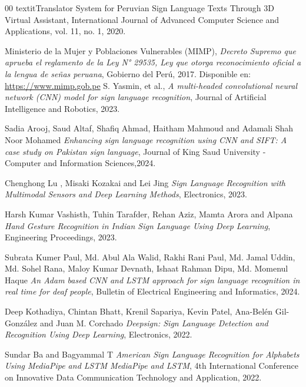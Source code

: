 \documentclass[preprint,12pt,authoryear]{elsarticle}
\begin{document}
\begin{thebibliography}{00}
 textit{Translator System for Peruvian Sign Language Texts Through 3D Virtual Assistant}, 
International Journal of Advanced Computer Science and Applications, vol. 11, no. 1, 2020.


   Ministerio de la Mujer y Poblaciones Vulnerables (MIMP),
   \textit{Decreto Supremo que aprueba el reglamento de la Ley N° 29535, Ley que otorga reconocimiento oficial a la lengua de señas peruana},
   Gobierno del Perú, 2017. Disponible en: \url{https://www.mimp.gob.pe} 
  S. Yasmin, et al.,
  \textit{A multi-headed convolutional neural network (CNN) model for sign language recognition},
  Journal of Artificial Intelligence and Robotics, 2023.




  
  Sadia Arooj, Saud Altaf, Shafiq Ahmad, Haitham Mahmoud and Adamali Shah Noor Mohamed
  \textit{Enhancing sign language recognition using CNN and SIFT: A case study on Pakistan sign language},
  Journal of King Saud University - Computer and Information Sciences,2024.
  
  Chenghong Lu , Misaki Kozakai and Lei Jing 
  \textit{Sign Language Recognition with Multimodal Sensors and Deep
Learning Methods},
  Electronics, 2023.
  
  Harsh Kumar Vashisth, Tuhin Tarafder, Rehan Aziz, Mamta Arora and Alpana
  \textit{Hand Gesture Recognition in Indian Sign Language Using
Deep Learning},
  Engineering Proceedings, 2023.
  
  Subrata Kumer Paul, Md. Abul Ala Walid, Rakhi Rani Paul, Md. Jamal Uddin, Md. Sohel Rana, Maloy Kumar Devnath, Ishaat Rahman Dipu, Md. Momenul Haque
  \textit{An Adam based CNN and LSTM approach for sign language recognition in real time for deaf people},
  Bulletin of Electrical Engineering and Informatics, 2024.

  Deep Kothadiya, Chintan Bhatt, Krenil Sapariya, Kevin Patel, Ana-Belén Gil-González and Juan M. Corchado
  \textit{Deepsign: Sign Language Detection and Recognition Using
Deep Learning},
  Electronics, 2022.

  Sundar Ba and Bagyammal T
  \textit{American Sign Language Recognition for Alphabets Using
MediaPipe and LSTM MediaPipe and LSTM},
  4th International Conference on Innovative Data Communication Technology and Application, 2022.


\end{thebibliography}
\end{document}
